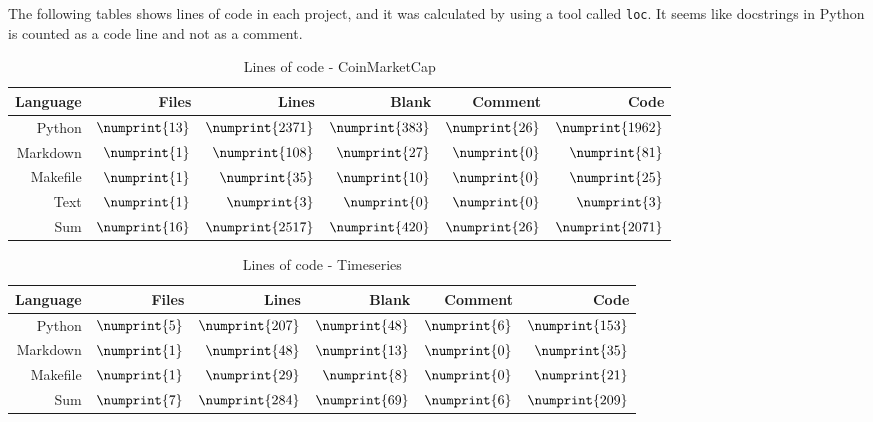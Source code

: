 The following tables shows lines of code in each project, and it was calculated by using a tool called \texttt{loc}. It seems like docstrings in Python is counted as a code line and not as a comment.

\begin{table}[ht]
        \centering
        \begin{tabularx}{\textwidth}{ |R|R|R|R|R|R| }\hline
        Language    & Files             & Lines             & Blank             & Comment           & Code              \\\hline
        Python      & $\numprint{13}$   & $\numprint{2371}$ & $\numprint{383}$  & $\numprint{26}$   & $\numprint{1962}$ \\
        Markdown    & $\numprint{1}$    & $\numprint{108}$  & $\numprint{27}$   & $\numprint{0}$    & $\numprint{81}$   \\
        Makefile    & $\numprint{1}$    & $\numprint{35}$   & $\numprint{10}$   & $\numprint{0}$    & $\numprint{25}$   \\
        Text        & $\numprint{1}$    & $\numprint{3}$    & $\numprint{0}$    & $\numprint{0}$    & $\numprint{3}$    \\\hline
        Sum         & $\numprint{16}$   & $\numprint{2517}$ & $\numprint{420}$  & $\numprint{26}$   & $\numprint{2071}$ \\\hline
        \end{tabularx}
        \caption{Lines of code - CoinMarketCap}
        \label{tab:cloc_coin}
\end{table}

\begin{table}[ht]
        \centering
        \begin{tabularx}{\textwidth}{ |R|R|R|R|R|R| }\hline
        Language    & Files             & Lines             & Blank             & Comment           & Code              \\\hline
        Python      & $\numprint{5}$    & $\numprint{207}$  & $\numprint{48}$   & $\numprint{6}$    & $\numprint{153}$  \\
        Markdown    & $\numprint{1}$    & $\numprint{48}$   & $\numprint{13}$   & $\numprint{0}$    & $\numprint{35}$   \\
        Makefile    & $\numprint{1}$    & $\numprint{29}$   & $\numprint{8}$    & $\numprint{0}$    & $\numprint{21}$   \\\hline
        Sum         & $\numprint{7}$    & $\numprint{284}$  & $\numprint{69}$   & $\numprint{6}$    & $\numprint{209}$  \\\hline
        \end{tabularx}
        \caption{Lines of code - Timeseries}
        \label{tab:cloc_timeseries}
\end{table}

